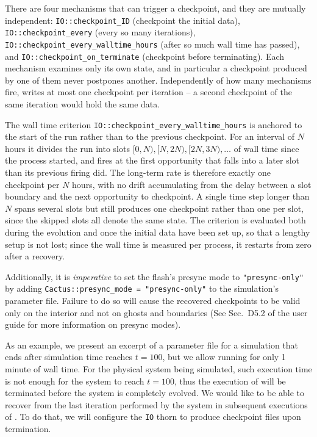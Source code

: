 There are four mechanisms that can trigger a checkpoint, and they are mutually independent: \texttt{IO::checkpoint\_ID} (checkpoint the initial data), \texttt{IO::checkpoint\_every} (every so many iterations), \texttt{IO::checkpoint\_every\_walltime\_hours} (after so much wall time has passed), and \texttt{IO::checkpoint\_on\_terminate} (checkpoint before terminating). Each mechanism examines only its own state, and in particular a checkpoint produced by one of them never postpones another. Independently of how many mechanisms fire, \CarpetX{} writes at most one checkpoint per iteration -- a second checkpoint of the same iteration would hold the same data.

The wall time criterion \texttt{IO::checkpoint\_every\_walltime\_hours} is anchored to the start of the run rather than to the previous checkpoint. For an interval of $N$ hours it divides the run into slots $[0,N), [N,2N), [2N,3N), \ldots$ of wall time since the process started, and fires at the first opportunity that falls into a later slot than its previous firing did. The long-term rate is therefore exactly one checkpoint per $N$ hours, with no drift accumulating from the delay between a slot boundary and the next opportunity to checkpoint. A single time step longer than $N$ spans several slots but still produces one checkpoint rather than one per slot, since the skipped slots all denote the same state. The criterion is evaluated both during the evolution and once the initial data have been set up, so that a lengthy setup is not lost; since the wall time is measured per process, it restarts from zero after a recovery.

Additionally, it is \textit{imperative} to set the flash's presync mode to \texttt{"presync-only"} by adding \texttt{Cactus::presync\_mode = "presync-only"} to the simulation's parameter file. Failure to do so will cause the recovered checkpoints to be valid only on the interior and not on ghosts and boundaries (See Sec.~D5.2 of the \Cactus\space user guide for more information on presync modes).

As an example, we present an excerpt of a parameter file for a simulation that ends after simulation time reaches $t=100$, but we allow \Cactus\space running for only 1 minute of wall time. For the physical system being simulated, such execution time is not enough for the system to reach $t=100$, thus the execution of \Cactus\space will be terminated before the system is completely evolved. We would like to be able to recover from the last iteration performed by the system in subsequent executions of \Cactus. To do that, we will configure the \texttt{IO} thorn to produce checkpoint files upon \Cactus\space termination.

